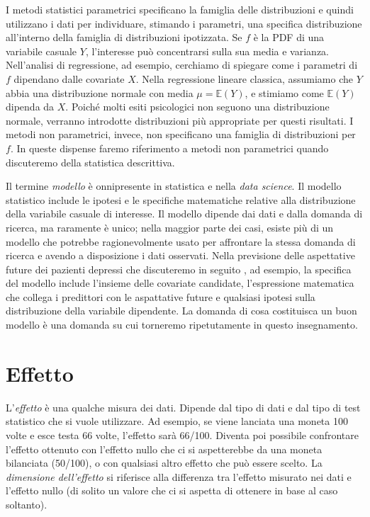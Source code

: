 \documentclass[
  11pt,
]{krantz}
\newcommand{\E}{\mathbb{E}} %
\theoremstyle{definition}
\theoremstyle{definition}
\theoremstyle{definition}
\theoremstyle{definition}
\theoremstyle{remark}
\begin{document}
I metodi statistici parametrici specificano la famiglia delle distribuzioni e quindi utilizzano i dati per individuare, stimando i parametri, una specifica distribuzione all'interno della famiglia di distribuzioni ipotizzata. Se \(f\) è la PDF di una variabile casuale \(Y\), l'interesse può concentrarsi sulla sua media e varianza. Nell'analisi di regressione, ad esempio, cerchiamo di spiegare come i parametri di \(f\) dipendano dalle covariate \(X\). Nella regressione lineare classica, assumiamo che \(Y\) abbia una distribuzione normale con media \(\mu = \E(Y)\), e stimiamo come \(\E(Y)\) dipenda da \(X\). Poiché molti esiti psicologici non seguono una distribuzione normale, verranno introdotte distribuzioni più appropriate per questi risultati. I metodi non parametrici, invece, non specificano una famiglia di distribuzioni per \(f\). In queste dispense faremo riferimento a metodi non parametrici quando discuteremo della statistica descrittiva.

Il termine \emph{modello} è onnipresente in statistica e nella \emph{data science}. Il modello statistico include le ipotesi e le specifiche matematiche relative alla distribuzione della variabile casuale di interesse. Il modello dipende dai dati e dalla domanda di ricerca, ma raramente è unico; nella maggior parte dei casi, esiste più di un modello che potrebbe ragionevolmente usato per affrontare la stessa domanda di ricerca e avendo a disposizione i dati osservati. Nella previsione delle aspettative future dei pazienti depressi che discuteremo in seguito \citep{zetschefuture2019}, ad esempio, la specifica del modello include l'insieme delle covariate candidate, l'espressione matematica che collega i predittori con le aspattative future e qualsiasi ipotesi sulla distribuzione della variabile dipendente. La domanda di cosa costituisca un buon modello è una domanda su cui torneremo ripetutamente in questo insegnamento.

\hypertarget{effetto}{%
\section{Effetto}\label{effetto}}

L'\emph{effetto} è una qualche misura dei dati. Dipende dal tipo di dati e dal tipo di test statistico che si vuole utilizzare. Ad esempio, se viene lanciata una moneta 100 volte e esce testa 66 volte, l'effetto sarà 66/100. Diventa poi possibile confrontare l'effetto ottenuto con l'effetto nullo che ci si aspetterebbe da una moneta bilanciata (50/100), o con qualsiasi altro effetto che può essere scelto. La \emph{dimensione dell'effetto} si riferisce alla differenza tra l'effetto misurato nei dati e l'effetto nullo (di solito un valore che ci si aspetta di ottenere in base al caso soltanto).
\end{document}

